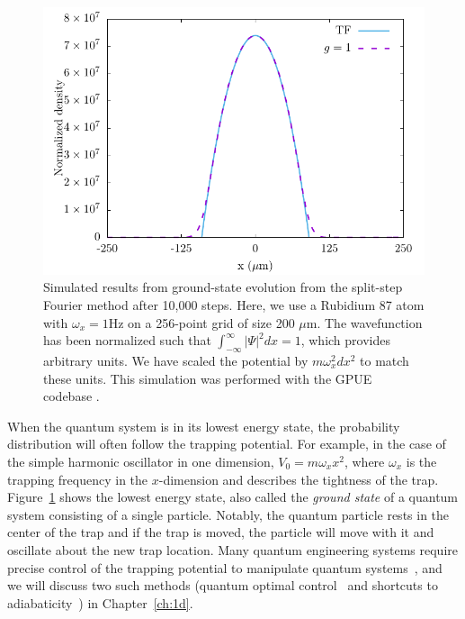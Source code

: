 \begin{figure}

\includegraphics[width = \textwidth]{data/qs/SHO/SHO.pdf}

\caption{Simulated results from ground-state evolution from the split-step Fourier method after 10,000 steps. Here, we use a Rubidium 87 atom with $\omega_x = 1$Hz on a 256-point grid of size 200 $\mu$m. The wavefunction has been normalized such that $\int_{-\infty}^\infty|\Psi|^2 dx = 1$, which provides arbitrary units. We have scaled the potential by $m \omega_x^2 dx^2$ to match these units. This simulation was performed with the GPUE codebase \cite{schloss2018}.}
\label{fig:SHO}
\end{figure}

When the quantum system is in its lowest energy state, the probability distribution will often follow the trapping potential.
For example, in the case of the simple harmonic oscillator in one dimension, $V_0 = m \omega_x x^2$, where $\omega_x$ is the trapping frequency in the $x$-dimension and describes the tightness of the trap.
Figure~\ref{fig:SHO} shows the lowest energy state, also called the \textit{ground state} of a quantum system consisting of a single particle.
Notably, the quantum particle rests in the center of the trap and if the trap is moved, the particle will move with it and oscillate about the new trap location.
Many quantum engineering systems require precise control of the trapping potential to manipulate quantum systems~\cite{menchon2016}, and we will discuss two such methods (quantum optimal control~\cite{werschnik2007} and shortcuts to adiabaticity~\cite{guery2019}) in Chapter~\ref{ch:1d}.

